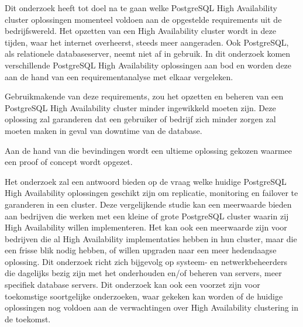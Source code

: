 Dit onderzoek heeft tot doel na te gaan welke PostgreSQL High Availability cluster oplossingen momenteel voldoen aan de opgestelde requirements uit de bedrijfswereld. Het opzetten van een High Availability cluster wordt in deze tijden, waar het internet overheerst, steeds meer aangeraden. Ook PostgreSQL, als relationele databaseserver, neemt niet af in gebruik. In dit onderzoek komen verschillende PostgreSQL High Availability oplossingen aan bod en worden deze aan de hand van een requirementanalyse met elkaar vergeleken.

Gebruikmakende van deze requirements, zou het opzetten en beheren van een PostgreSQL High Availability cluster minder ingewikkeld moeten zijn. Deze oplossing zal garanderen dat een gebruiker of bedrijf zich minder zorgen zal moeten maken in geval van downtime van de database.

Aan de hand van die bevindingen wordt een ultieme oplossing gekozen waarmee een proof of concept wordt opgezet.

Het onderzoek zal een antwoord bieden op de vraag welke huidige PostgreSQL High Availability oplossingen geschikt zijn om replicatie, monitoring en failover te garanderen in een cluster.
Deze vergelijkende studie kan een meerwaarde bieden aan bedrijven die werken met een kleine of grote PostgreSQL cluster waarin zij High Availability willen implementeren. Het kan ook een meerwaarde zijn voor bedrijven die al High Availability implementaties hebben in hun cluster, maar die een frisse blik nodig hebben, of willen upgraden naar een meer hedendaagse oplossing. Dit onderzoek richt zich bijgevolg op systeem- en netwerkbeheerders die dagelijks bezig zijn met het onderhouden en/of beheren van servers, meer specifiek database servers.
Dit onderzoek kan ook een voorzet zijn voor toekomstige soortgelijke onderzoeken, waar gekeken kan worden of de huidige oplossingen nog voldoen aan de verwachtingen over High Availability clustering in de toekomst.
